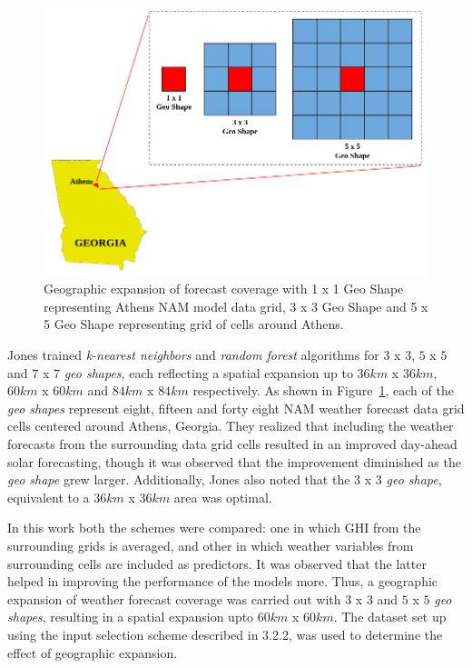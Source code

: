 \begin{figure}[ht]
    \begin{center}
    	\includegraphics[scale=0.23]{chapter3/fig_geoshapes.png}
    	\caption[Geographic expansion of forecast coverage around Athens NAM model data grid]{Geographic expansion of forecast coverage with 1 x 1 Geo Shape representing Athens NAM model data grid, 3 x 3 Geo Shape and 5 x 5 Geo Shape representing grid of cells around Athens.}
    	\label{fig:fig_geoshapes}
    \end{center}
\end{figure}

\par Jones \cite{thesis_zach} trained \textit{k-nearest neighbors} and \textit{random forest} algorithms for $3$ x $3$, $5$ x $5$ and $7$ x $7$ \textit{geo shapes}, each reflecting a spatial expansion up to $36km$ x $36km$, $60km$ x $60km$ and $84km$ x $84km$ respectively. As shown in Figure~\ref{fig:fig_geoshapes}, each of the \textit{geo shapes} represent eight, fifteen and forty eight NAM weather forecast data grid cells centered around Athens, Georgia. They realized that including the weather forecasts from the surrounding data grid cells resulted in an improved day-ahead solar forecasting, though it was observed that the improvement diminished as the \textit{geo shape} grew larger. Additionally, Jones \cite{thesis_zach} also noted that the $3$ x $3$ \textit{geo shape}, equivalent to a $36km$ x $36km$ area was optimal. 

\par In this work both the schemes were compared: one in which GHI from the surrounding grids is averaged, and other in which weather variables from surrounding cells are included as predictors. It was observed that the latter helped in improving the performance of the models more. Thus, a geographic expansion of weather forecast coverage was carried out with $3$ x $3$ and $5$ x $5$ \textit{geo shapes}, resulting in a spatial expansion upto $60km$ x $60km$. The dataset set up using the input selection scheme described in 3.2.2, was used to determine the effect of geographic expansion.

